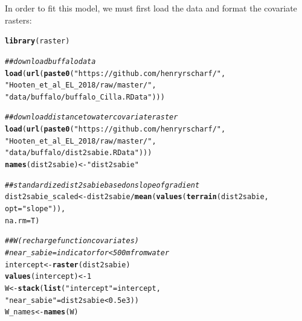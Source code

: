\documentclass[12pt]{article}\usepackage[]{graphicx}\usepackage[]{xcolor}
\makeatletter
\newcommand{\hlnum}[1]{\textcolor[rgb]{0.686,0.059,0.569}{#1}}%
\newcommand{\hlsng}[1]{\textcolor[rgb]{0.192,0.494,0.8}{#1}}%
\newcommand{\hlcom}[1]{\textcolor[rgb]{0.678,0.584,0.686}{\textit{#1}}}%
\newcommand{\hlopt}[1]{\textcolor[rgb]{0,0,0}{#1}}%
\newcommand{\hldef}[1]{\textcolor[rgb]{0.345,0.345,0.345}{#1}}%
\newcommand{\hlkwb}[1]{\textcolor[rgb]{0.69,0.353,0.396}{#1}}%
\newcommand{\hlkwc}[1]{\textcolor[rgb]{0.333,0.667,0.333}{#1}}%
\newcommand{\hlkwd}[1]{\textcolor[rgb]{0.737,0.353,0.396}{\textbf{#1}}}%
\newenvironment{kframe}{%
 \def\at@end@of@kframe{}%
 \ifinner\ifhmode%
  \def\at@end@of@kframe{\end{minipage}}%
  \begin{minipage}{\columnwidth}%
 \fi\fi%
 \def\FrameCommand##1{\hskip\@totalleftmargin \hskip-\fboxsep
 \colorbox{shadecolor}{##1}\hskip-\fboxsep
     \hskip-\linewidth \hskip-\@totalleftmargin \hskip\columnwidth}%
 \MakeFramed {\advance\hsize-\width
   \@totalleftmargin\z@ \linewidth\hsize
   \@setminipage}}%
 {\par\unskip\endMakeFramed%
 \at@end@of@kframe}
\newenvironment{knitrout}{}{} %
\let\hlstd\hldef
\let\hlstr\hlsng
\makeatother
\begin{document}
In order to fit this model, we must first load the data and format the covariate rasters:
\begin{knitrout}
\color{fgcolor}\begin{kframe}
\begin{alltt}
\hlkwd{library}\hlstd{(raster)}

\hlcom{## download buffalo data}
\hlkwd{load}\hlstd{(}\hlkwd{url}\hlstd{(}\hlkwd{paste0}\hlstd{(}\hlstr{"https://github.com/henryrscharf/"}\hlstd{,}
         \hlstr{"Hooten_et_al_EL_2018/raw/master/"}\hlstd{,}
         \hlstr{"data/buffalo/buffalo_Cilla.RData"}\hlstd{)))}

\hlcom{## download distance to water covariate raster}
\hlkwd{load}\hlstd{(}\hlkwd{url}\hlstd{(}\hlkwd{paste0}\hlstd{(}\hlstr{"https://github.com/henryrscharf/"}\hlstd{,}
                \hlstr{"Hooten_et_al_EL_2018/raw/master/"}\hlstd{,}
                \hlstr{"data/buffalo/dist2sabie.RData"}\hlstd{)))}
\hlkwd{names}\hlstd{(dist2sabie)} \hlkwb{<-} \hlstr{"dist2sabie"}

\hlcom{## standardize dist2sabie based on slope of gradient}
\hlstd{dist2sabie_scaled} \hlkwb{<-} \hlstd{dist2sabie} \hlopt{/} \hlkwd{mean}\hlstd{(}\hlkwd{values}\hlstd{(}\hlkwd{terrain}\hlstd{(dist2sabie,}
                                                      \hlkwc{opt} \hlstd{=} \hlstr{"slope"}\hlstd{)),}
                                       \hlkwc{na.rm} \hlstd{= T)}

\hlcom{## W (recharge function covariates)}
\hlcom{# near_sabie = indicator for <500m from water}
\hlstd{intercept} \hlkwb{<-} \hlkwd{raster}\hlstd{(dist2sabie)}
\hlkwd{values}\hlstd{(intercept)} \hlkwb{<-} \hlnum{1}
\hlstd{W} \hlkwb{<-} \hlkwd{stack}\hlstd{(}\hlkwd{list}\hlstd{(}\hlstr{"intercept"} \hlstd{= intercept,}
                \hlstr{"near_sabie"} \hlstd{= dist2sabie} \hlopt{<} \hlnum{0.5e3}\hlstd{))}
\hlstd{W_names} \hlkwb{<-} \hlkwd{names}\hlstd{(W)}


\end{alltt}
\end{kframe}
\end{knitrout}
\end{document}

